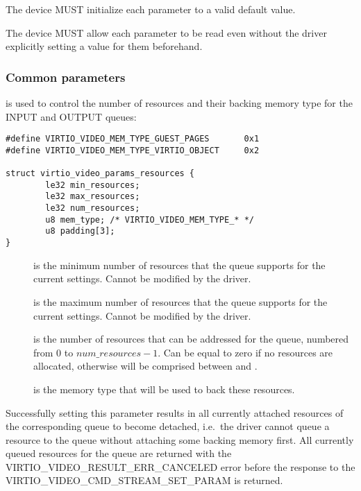 
The device MUST initialize each parameter to a valid default value.

The device MUST allow each parameter to be read even without the driver
explicitly setting a value for them beforehand.

\subsubsection{Common parameters}\label{sec:Device Types / Video Device / Parameters / Common parameters}

 is used to control the
number of resources and their backing memory type for the INPUT and
OUTPUT queues:

\begin{lstlisting}
#define VIRTIO_VIDEO_MEM_TYPE_GUEST_PAGES       0x1
#define VIRTIO_VIDEO_MEM_TYPE_VIRTIO_OBJECT     0x2

struct virtio_video_params_resources {
        le32 min_resources;
        le32 max_resources;
        le32 num_resources;
        u8 mem_type; /* VIRTIO_VIDEO_MEM_TYPE_* */
        u8 padding[3];
}
\end{lstlisting}

\begin{description}
\item[]
is the minimum number of resources that the queue supports for the
current settings. Cannot be modified by the driver.
\item[]
is the maximum number of resources that the queue supports for the
current settings. Cannot be modified by the driver.
\item[]
is the number of resources that can be addressed for the queue, numbered
from \(0\) to \(num\_resources - 1\). Can be equal to zero if no
resources are allocated, otherwise will be comprised between
 and .
\item[]
is the memory type that will be used to back these resources.
\end{description}

Successfully setting this parameter results in all currently attached
resources of the corresponding queue to become detached, i.e.~the driver
cannot queue a resource to the queue without attaching some backing
memory first. All currently queued resources for the queue are returned
with the VIRTIO\_VIDEO\_RESULT\_ERR\_CANCELED error before the response
to the VIRTIO\_VIDEO\_CMD\_STREAM\_SET\_PARAM is returned.

